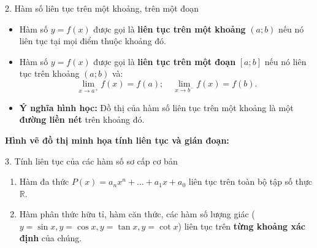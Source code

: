 \documentclass[12pt, a4paper]{article}
\begin{document}
\begin{pedabox}{2. Hàm số liên tục trên một khoảng, trên một đoạn}
\begin{itemize}[leftmargin=0.6cm]
    \item Hàm số $y = f(x)$ được gọi là \textbf{liên tục trên một khoảng} $(a; b)$ nếu nó liên tục tại mọi điểm thuộc khoảng đó.
    \item Hàm số $y = f(x)$ được gọi là \textbf{liên tục trên một đoạn} $[a; b]$ nếu nó liên tục trên khoảng $(a; b)$ và:
    $$\lim_{x \to a^+} f(x) = f(a); \quad \lim_{x \to b^-} f(x) = f(b).$$
    \item \textbf{Ý nghĩa hình học:} Đồ thị của hàm số liên tục trên một khoảng là một \textbf{đường liền nét} trên khoảng đó.
\end{itemize}
\end{pedabox}

\noindent \textbf{Hình vẽ đồ thị minh họa tính liên tục và gián đoạn:}
\begin{center}
\end{center}

\begin{pedabox}{3. Tính liên tục của các hàm số sơ cấp cơ bản}
\begin{enumerate}[leftmargin=0.6cm]
    \item Hàm đa thức $P(x) = a_n x^n + \dots + a_1 x + a_0$ liên tục trên toàn bộ tập số thực $\mathbb{R}$.
    \item Hàm phân thức hữu tỉ, hàm căn thức, các hàm số lượng giác ($y = \sin x, y = \cos x, y = \tan x, y = \cot x$) liên tục trên \textbf{từng khoảng xác định} của chúng.
\end{enumerate}
\end{pedabox}
\end{document}
